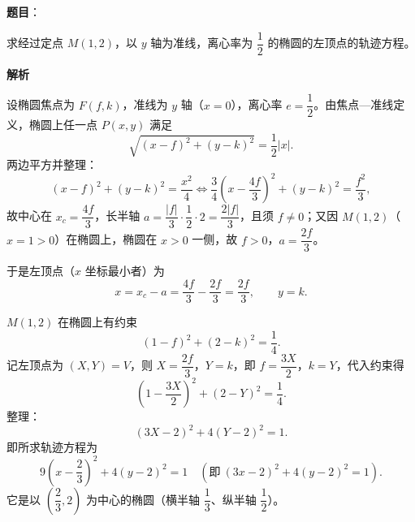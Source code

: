 \begin{answer}

\textbf{题目}：

求经过定点 $M(1,2)$，以 $y$ 轴为准线，离心率为 $\dfrac12$ 的椭圆的左顶点的轨迹方程。

\textbf{解析}

设椭圆焦点为 $F(f,k)$，准线为 $y$ 轴（$x=0$），离心率 $e=\dfrac12$。由焦点—准线定义，椭圆上任一点 $P(x,y)$ 满足
\nopagebreak[4]
\[
\sqrt{(x-f)^2+(y-k)^2}=\frac12|x|.
\]
两边平方并整理：
\nopagebreak[4]
\[
(x-f)^2+(y-k)^2=\frac{x^2}4
\iff \frac34\left(x-\frac{4f}3\right)^2+(y-k)^2=\frac{f^2}3,
\]
故中心在 $x_c=\dfrac{4f}3$，长半轴 $a=\dfrac{|f|}3\cdot\dfrac12\cdot2=\dfrac{2|f|}3$，且须 $f\ne0$；又因 $M(1,2)$（$x=1>0$）在椭圆上，椭圆在 $x>0$ 一侧，故 $f>0$，$a=\dfrac{2f}3$。

于是左顶点（$x$ 坐标最小者）为
\nopagebreak[4]
\[
x=x_c-a=\frac{4f}3-\frac{2f}3=\frac{2f}3,\qquad y=k.
\]

$M(1,2)$ 在椭圆上有约束
\nopagebreak[4]
\[
(1-f)^2+(2-k)^2=\frac14.
\]
记左顶点为 $(X,Y)=V$，则 $X=\dfrac{2f}3$，$Y=k$，即 $f=\dfrac{3X}2$，$k=Y$，代入约束得
\nopagebreak[4]
\[
\left(1-\frac{3X}2\right)^2+(2-Y)^2=\frac14.
\]
整理：
\nopagebreak[4]
\[
(3X-2)^2+4(Y-2)^2=1.
\]
即所求轨迹方程为
\nopagebreak[4]
\[
9\left(x-\frac23\right)^2+4(y-2)^2=1\quad(\text{即}\ (3x-2)^2+4(y-2)^2=1).
\]
它是以 $\left(\dfrac23,2\right)$ 为中心的椭圆（横半轴 $\dfrac13$、纵半轴 $\dfrac12$）。


\end{answer}

